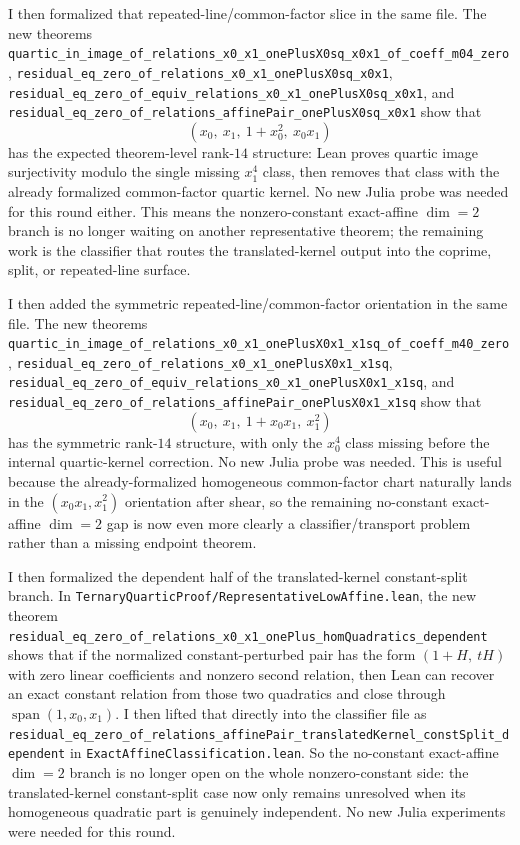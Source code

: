\documentclass[11pt]{article}
\begin{document}
I then formalized that repeated-line/common-factor slice in the same file. The
new theorems
\texttt{quartic\_in\_image\_of\_relations\_x0\_x1\_onePlusX0sq\_x0x1\_of\_coeff\_m04\_zero},
\texttt{residual\_eq\_zero\_of\_relations\_x0\_x1\_onePlusX0sq\_x0x1},
\texttt{residual\_eq\_zero\_of\_equiv\_relations\_x0\_x1\_onePlusX0sq\_x0x1},
and
\texttt{residual\_eq\_zero\_of\_relations\_affinePair\_onePlusX0sq\_x0x1}
show that
\[
  (x_0,\ x_1,\ 1 + x_0^2,\ x_0x_1)
\]
has the expected theorem-level rank-\(14\) structure: Lean proves quartic image
surjectivity modulo the single missing \(x_1^4\) class, then removes that class
with the already formalized common-factor quartic kernel. No new Julia probe was
needed for this round either. This means the nonzero-constant exact-affine
\(\dim=2\) branch is no longer waiting on another representative theorem; the
remaining work is the classifier that routes the translated-kernel output into
the coprime, split, or repeated-line surface.

I then added the symmetric repeated-line/common-factor orientation in the same
file. The new theorems
\texttt{quartic\_in\_image\_of\_relations\_x0\_x1\_onePlusX0x1\_x1sq\_of\_coeff\_m40\_zero},
\texttt{residual\_eq\_zero\_of\_relations\_x0\_x1\_onePlusX0x1\_x1sq},
\texttt{residual\_eq\_zero\_of\_equiv\_relations\_x0\_x1\_onePlusX0x1\_x1sq},
and
\texttt{residual\_eq\_zero\_of\_relations\_affinePair\_onePlusX0x1\_x1sq}
show that
\[
  (x_0,\ x_1,\ 1 + x_0x_1,\ x_1^2)
\]
has the symmetric rank-\(14\) structure, with only the \(x_0^4\) class missing
before the internal quartic-kernel correction. No new Julia probe was needed.
This is useful because the already-formalized homogeneous common-factor chart
naturally lands in the \((x_0x_1, x_1^2)\) orientation after shear, so the
remaining no-constant exact-affine \(\dim=2\) gap is now even more clearly a
classifier/transport problem rather than a missing endpoint theorem.

I then formalized the dependent half of the translated-kernel constant-split
branch. In \texttt{TernaryQuarticProof/RepresentativeLowAffine.lean}, the new
theorem
\texttt{residual\_eq\_zero\_of\_relations\_x0\_x1\_onePlus\_homQuadratics\_dependent}
shows that if the normalized constant-perturbed pair has the form
\((1 + H,\ tH)\) with zero linear coefficients and nonzero second relation,
then Lean can recover an exact constant relation from those two quadratics and
close through \(\operatorname{span}(1,x_0,x_1)\). I then lifted that directly
into the classifier file as
\texttt{residual\_eq\_zero\_of\_relations\_affinePair\_translatedKernel\_constSplit\_dependent}
in \texttt{ExactAffineClassification.lean}. So the no-constant exact-affine
\(\dim=2\) branch is no longer open on the whole nonzero-constant side: the
translated-kernel constant-split case now only remains unresolved when its
homogeneous quadratic part is genuinely independent. No new Julia experiments
were needed for this round.
\end{document}
